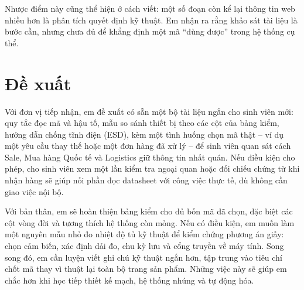 Nhược điểm này cũng thể hiện ở cách viết: một số đoạn còn kể lại thông tin web
nhiều hơn là phân tích quyết định kỹ thuật. Em nhận ra rằng khảo sát tài liệu
là bước cần, nhưng chưa đủ để khẳng định một mã ``dùng được'' trong hệ thống
cụ thể.

\section{Đề xuất}

Với đơn vị tiếp nhận, em đề xuất có sẵn một bộ tài liệu ngắn cho sinh viên mới:
quy tắc đọc mã và hậu tố, mẫu so sánh thiết bị theo các cột của bảng kiểm, hướng
dẫn chống tĩnh điện (ESD), kèm một tình huống chọn mã thật -- ví dụ một yêu cầu
thay thế hoặc một đơn hàng đã xử lý -- để sinh viên quan sát cách Sale, Mua hàng
Quốc tế và Logistics giữ thông tin nhất quán. Nếu điều kiện cho phép, cho sinh
viên xem một lần kiểm tra ngoại quan hoặc đối chiếu chứng từ khi nhận hàng sẽ
giúp nối phần đọc datasheet với công việc thực tế, dù không cần giao việc nội
bộ.

Với bản thân, em sẽ hoàn thiện bảng kiểm cho đủ bốn mã đã chọn, đặc biệt các
cột vòng đời và tương thích hệ thống còn mỏng. Nếu có điều kiện, em muốn làm
một nguyên mẫu nhỏ đo nhiệt độ tủ kỹ thuật để kiểm chứng phương án giấy: chọn
cảm biến, xác định dải đo, chu kỳ lưu và cổng truyền về máy tính. Song song đó,
em cần luyện viết ghi chú kỹ thuật ngắn hơn, tập trung vào tiêu chí chốt mã thay
vì thuật lại toàn bộ trang sản phẩm. Những việc này sẽ giúp em chắc hơn khi học
tiếp thiết kế mạch, hệ thống nhúng và tự động hóa.
